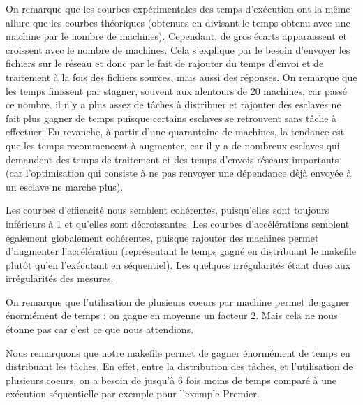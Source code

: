\documentclass[a4paper, 11pt, titlepage]{article}
\begin{document}
On remarque que les courbes expérimentales des temps d'exécution ont la même allure que les courbes théoriques (obtenues en divisant le temps obtenu avec une machine par le nombre de machines). Cependant, de gros écarts apparaissent et croissent avec le nombre de machines. Cela s'explique par le besoin d'envoyer les fichiers sur le réseau et donc par le fait de rajouter du temps d'envoi et de traitement à la fois des fichiers sources, mais aussi des réponses. On remarque que les temps finissent par stagner, souvent aux alentours de 20 machines, car passé ce nombre, il n'y a plus assez de tâches à distribuer et rajouter des esclaves ne fait plus gagner de temps puisque certains esclaves se retrouvent sans tâche à effectuer. En revanche, à partir d'une quarantaine de machines, la tendance est que les temps recommencent à augmenter, car il y a de nombreux esclaves qui demandent des temps de traitement et des temps d'envois réseaux importants (car l'optimisation qui consiste à ne pas renvoyer une dépendance déjà envoyée à un esclave ne marche plus).

Les courbes d'efficacité nous semblent cohérentes, puisqu'elles sont toujours inférieurs à 1 et qu'elles sont décroissantes. Les courbes d'accélérations semblent également globalement cohérentes, puisque rajouter des machines permet d'augmenter l'accélération (représentant le temps gagné en distribuant le makefile plutôt qu'en l'exécutant en séquentiel). Les quelques irrégularités étant dues aux irrégularités des mesures.  


On remarque que l'utilisation de plusieurs coeurs par machine permet de gagner énormément de temps : on gagne en moyenne un facteur 2. Mais cela ne nous étonne pas car c'est ce que nous attendions.

Nous remarquons que notre makefile permet de gagner énormément de temps en distribuant les tâches. En effet, entre la distribution des tâches, et l'utilisation de plusieurs coeurs, on a besoin de jusqu'à 6 fois moins de temps comparé à une exécution séquentielle par exemple pour l'exemple Premier.
\end{document}
